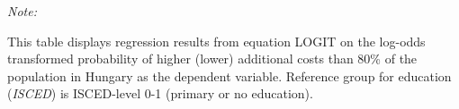 \begin{table}[htbp!]
\begin{adjustbox}{width = 1\textwidth, max height = 0.95\textheight, center}
\begin{threeparttable}[b]
         \begin{tablenotes}\item \medskip \textit{Note:}
            \item This table displays regression results from equation LOGIT on the log-odds transformed probability of higher (lower) additional costs than 80\% of the population in Hungary as the dependent variable. Reference group for education (\textit{ISCED}) is ISCED-level 0-1 (primary or no education).
         \end{tablenotes}
      \end{threeparttable}
   \end{adjustbox}
\end{table}


